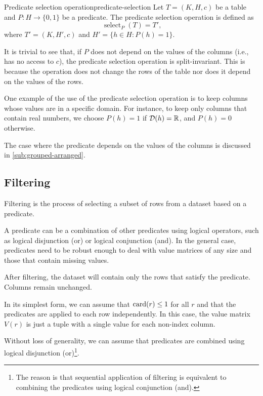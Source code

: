 \begin{defbox}{Predicate selection operation}{predicate-selection}
  Let $T = (K, H, c)$ be a table and $P : H \to \{0, 1\}$ be a predicate.  The predicate
  selection operation is defined as \[
    \operatorname{select}_{P}(T) = T'\text{,}
  \] where $T' = (K, H', c)$ and $H' = \{h \in H : P(h) = 1\}$.
\end{defbox}

It is trivial to see that, if $P$ does not depend on the values of the columns (i.e., has no
access to $c$), the predicate selection operation is split-invariant.  This is because the
operation does not change the rows of the table nor does it depend on the values of the rows.

One example of the use of the predicate selection operation is to keep columns whose
values are in a specific domain.  For instance, to keep only columns that contain real
numbers, we choose $P(h) = 1$ if $\domainof{h} = \mathbb{R}$, and $P(h) = 0$ otherwise.

The case where the predicate depends on the values of the columns is discussed in
\cref{sub:grouped-arranged}.

\subsection{Filtering}
\label{sub:filtering}

Filtering is the process of selecting a subset of rows from a dataset based on a
predicate.

A predicate can be a combination of other predicates using logical operators, such as
logical disjunction (or) or logical conjunction (and).  In the general case, predicates
need to be robust enough to deal with value matrices of any size and those that contain missing
values.

After filtering, the dataset will contain only the rows that satisfy the predicate.
Columns remain unchanged.

In its simplest form, we can assume that $\rowcard[r] \leq 1$ for all $r$ and that the
predicates are applied to each row independently.  In this case, the value matrix $V(r)$
is just a tuple with a single value for each non-index column.

Without loss of generality, we can assume that predicates are combined using logical
disjunction (or)\footnote{The reason is that sequential application of filtering is
equivalent to combining the predicates using logical conjunction (and).}.

